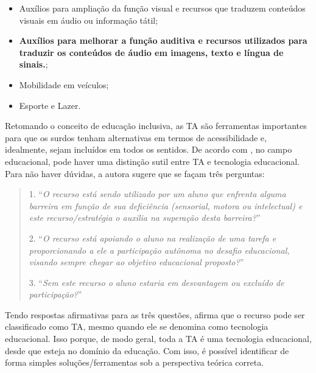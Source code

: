 \begin{itemize}
\item Auxílios para ampliação da função visual e recursos que traduzem conteúdos visuais em áudio ou informação tátil;%
\item \textbf{Auxílios para melhorar a função auditiva e recursos utilizados para traduzir os conteúdos de áudio em imagens, texto e língua de sinais.};%
\item Mobilidade em veículos;%
\item Esporte e Lazer.
\end{itemize}

Retomando o conceito de educação inclusiva, as TA são ferramentas importantes para que os surdos tenham alternativas em termos de acessibilidade e, idealmente, sejam incluídos em todos os sentidos. De acordo com , no campo educacional, pode haver uma distinção sutil entre TA e tecnologia educacional. Para não haver dúvidas, a autora sugere que se façam três perguntas:

\begin{quote}

1. ``\textit{O recurso está sendo utilizado por um aluno que enfrenta alguma barreira em função de sua deficiência (sensorial, motora ou intelectual) e este recurso/estratégia o auxilia na superação desta barreira?}''

2. ``\textit{O recurso está apoiando o aluno na realização de uma tarefa e proporcionando a ele a participação autônoma no desafio educacional, visando sempre chegar ao objetivo educacional proposto?}''

3. ``\textit{Sem este recurso o aluno estaria em desvantagem ou excluído de participação?}''

\end{quote}

Tendo respostas afirmativas para as três questões,  afirma que o recurso pode ser classificado como TA, mesmo quando ele se denomina como tecnologia educacional. Isso porque, de modo geral, toda a TA é uma tecnologia educacional, desde que esteja no domínio da educação. Com isso, é possível identificar de forma simples soluções/ferramentas sob a perspectiva teórica correta.

